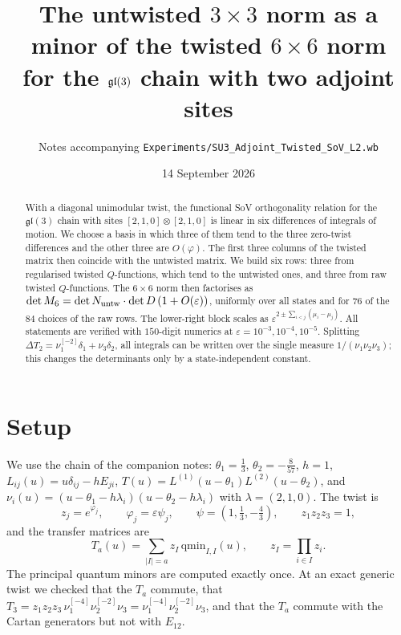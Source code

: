 \documentclass[11pt]{article}
\title{The untwisted $3\times3$ norm as a minor of the twisted $6\times6$ norm\\
for the $\gl(3)$ chain with two adjoint sites}
\author{Notes accompanying \texttt{Experiments/SU3\_Adjoint\_Twisted\_SoV\_L2.wb}}
\date{14 September 2026}
\newcommand{\sh}[1]{^{[#1]}}
\newcommand{\gl}{\mathfrak{gl}}
\begin{document}
\maketitle

\begin{abstract}
With a diagonal unimodular twist, the functional SoV orthogonality relation for the $\gl(3)$ chain
with sites $[2,1,0]\otimes[2,1,0]$ is linear in six differences of integrals of motion. We choose a
basis in which three of them tend to the three zero-twist differences and the other three are
$O(\varphi)$. The first three columns of the twisted matrix then coincide with the untwisted matrix.
We build six rows: three from regularised twisted $Q$-functions, which tend to the untwisted ones,
and three from raw twisted $Q$-functions. The $6\times6$ norm then factorises as
$\det M_6=\det N_{\rm untw}\cdot\det D\,(1+O(\varepsilon))$, uniformly over all states and for
$76$ of the $84$ choices of the raw rows. The lower-right block scales as
$\varepsilon^{2\pm\sum_{i<j}(\mu_i-\mu_j)}$. All statements are verified with $150$-digit numerics
at $\varepsilon=10^{-3},10^{-4},10^{-5}$. Splitting $\Delta T_2=\nu_1\sh{-2}\delta_1+\nu_3\delta_2$, all
integrals can be written over the single measure $1/(\nu_1\nu_2\nu_3)$; this changes the
determinants only by a state-independent constant.
\end{abstract}

\tableofcontents

\section{Setup}

We use the chain of the companion notes: $\theta_1=\tfrac13$, $\theta_2=-\tfrac8{57}$, $h=1$,
$L_{ij}(u)=u\delta_{ij}-hE_{ji}$, $T(u)=L^{(1)}(u-\theta_1)L^{(2)}(u-\theta_2)$, and
$\nu_i(u)=(u-\theta_1-h\lambda_i)(u-\theta_2-h\lambda_i)$ with $\lambda=(2,1,0)$. The twist is
\begin{equation}
z_j=e^{\varphi_j},\qquad \varphi_j=\varepsilon\psi_j,\qquad \psi=(1,\tfrac13,-\tfrac43),\qquad z_1z_2z_3=1,
\end{equation}
and the transfer matrices are
\begin{equation}
T_a(u)=\sum_{|I|=a}z_I\,\mathrm{qmin}_{I,I}(u),\qquad z_I=\prod_{i\in I}z_i.
\end{equation}
The principal quantum minors are computed exactly once. At an exact generic twist we checked that
the $T_a$ commute, that $T_3=z_1z_2z_3\,\nu_1\sh{-4}\nu_2\sh{-2}\nu_3=\nu_1\sh{-4}\nu_2\sh{-2}\nu_3$,
and that the $T_a$ commute with the Cartan generators but not with $E_{12}$.
\end{document}
